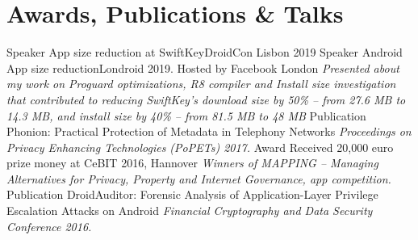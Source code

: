 \documentclass[]{friggeri-cv}
\begin{document}
\section{Awards, Publications \& Talks}
	\begin{entrylist}
        \entry
            {Speaker}
            {App size reduction at SwiftKey}{DroidCon Lisbon 2019}
            {}
            {Speaker}
            {Android App size reduction}{Londroid 2019. Hosted by Facebook London}
            {\emph{Presented about my work on Proguard optimizations, R8 compiler and Install size investigation that contributed to reducing SwiftKey's download size by 50\% -- from 27.6 MB to 14.3 MB, and install size by 40\% -- from 81.5 MB to 48 MB}}
        \entry
            {Publication}
            {Phonion: Practical Protection of Metadata in Telephony Networks}{}
            {\emph{Proceedings on Privacy Enhancing Technologies (PoPETs) 2017.}}
        \entry
            {Award}
            {Received 20,000 euro prize money at CeBIT 2016, Hannover}{}
            {\emph{Winners of MAPPING -- Managing Alternatives for Privacy, Property and Internet Governance, app competition.}}
        \entry
            {Publication}
            {DroidAuditor: Forensic Analysis of Application-Layer Privilege Escalation Attacks on Android}{}
            {\emph{Financial Cryptography and Data Security Conference 2016.}}        
	\end{entrylist}
\end{document}
